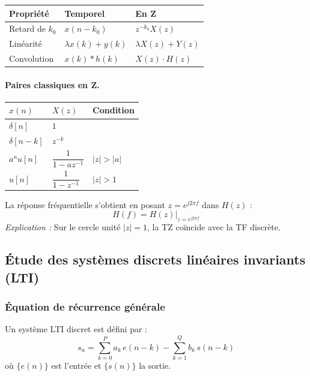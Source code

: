 \documentclass[12pt,a4paper]{article}
\begin{document}
\begin{center}
\renewcommand{\arraystretch}{1.4}
\begin{tabular}{@{}lll@{}}
\toprule
\textbf{Propriété} & \textbf{Temporel} & \textbf{En Z} \\
\midrule
Retard de $k_0$ & $x(n-k_0)$ & $z^{-k_0} X(z)$ \\
Linéarité & $\lambda x(k) + y(k)$ & $\lambda X(z) + Y(z)$ \\
Convolution & $x(k)*h(k)$ & $X(z)\cdot H(z)$ \\
\bottomrule
\end{tabular}
\end{center}

\paragraph{Paires classiques en Z.}

\begin{center}
\renewcommand{\arraystretch}{1.5}
\begin{tabular}{@{}lll@{}}
\toprule
$x(n)$ & $X(z)$ & Condition \\
\midrule
$\delta[n]$ & $1$ & \\
$\delta[n-k]$ & $z^{-k}$ & \\
$a^n u[n]$ & $\dfrac{1}{1-az^{-1}}$ & $|z|>|a|$ \\[0.5em]
$u[n]$ & $\dfrac{1}{1-z^{-1}}$ & $|z|>1$ \\
\bottomrule
\end{tabular}
\end{center}

\begin{tcolorbox}[methbox, title=Lien TZ $\leftrightarrow$ TFTD]
La réponse fréquentielle s'obtient en posant $z = e^{j2\pi f}$ dans $H(z)$ :
\[
  H(f) = H(z)\Big|_{z=e^{j2\pi f}}
\]
\textit{Explication :} Sur le cercle unité $|z|=1$, la TZ coïncide avec la TF discrète.
\end{tcolorbox}

\subsection{Étude des systèmes discrets linéaires invariants (LTI)}

\subsubsection{Équation de récurrence générale}

Un système LTI discret est défini par :
\[
  s_n = \sum_{k=0}^{P} a_k\,e(n-k) - \sum_{k=1}^{Q} b_k\,s(n-k)
\]
où $\{e(n)\}$ est l'entrée et $\{s(n)\}$ la sortie.
\end{document}
